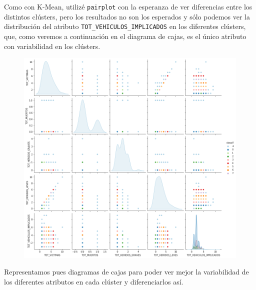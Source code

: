 \documentclass[a4]{article}
\begin{document}
Como con K-Mean, utilizé \texttt{pairplot} con la esperanza de ver diferencias entre los distintos clústers, pero los resultados no son los esperados y sólo podemos ver la distribución del atributo \texttt{TOT\_VEHICULOS\_IMPLICADOS} en los diferentes clústers, que, como veremos a continuación en el diagrama de cajas, es el único atributo con variabilidad en los clústers.

\begin{figure}[H]
  \centering
  \includegraphics[width=180mm]{imagenes/c2_dbscan_pairplot}
\end{figure}

Representamos pues diagramas de cajas para poder ver mejor la variabilidad de los diferentes atributos en cada clúster y diferenciarlos así.
\end{document}
